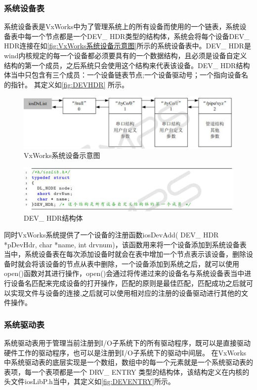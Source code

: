 	
\subsubsection{系统设备表}
	系统设备表是VxWorks中为了管理系统上的所有设备而使用的一个链表，系统设备表中每一个节点都是一个DEV\_ HDR类型的结构体，系统会将每个设备DEV\_ HDR连接在如\autoref{fig:VxWorks系统设备示意图}所示的系统设备表中。DEV\_ HDR是wind内核规定的每一个设备都必须要具有的一个数据结构，且必须是设备自定义结构的第一个成员，之后系统只会使用这个结构来代表该设备。DEV\_ HDR结构体当中只包含有三个成员：一个设备链表节点;一个设备驱动号；一个指向设备名的指针。
	其定义如\autoref{fig:DEVHDR} 所示。

\begin{figure}[!h]
\centering
\includegraphics[width=1.0\textwidth]{./graphics/vxworks-device-link.pdf}
\caption{VxWorks系统设备示意图}\label{fig:VxWorks系统设备示意图}
\end{figure}
	
\begin{figure}[!h]
\centering
\includegraphics[width=1.0\textwidth]{./graphics/DEVHDR.pdf}
\caption{DEV\_ HDR结构体}\label{fig:DEVHDR}
\end{figure}

同时VxWorks系统提供了一个设备的注册函数iosDevAdd( DEV\_ HDR *pDevHdr, char *name, int drvnum)，该函数用来将一个设备添加到系统设备表当中，系统设备表在每次添加设备时就会在表中增加一个节点表示该设备，删除设备时就会将该设备的节点从表中删除，一个设备添加到系统之后，就可以使用open()函数对其进行操作，open()会通过将传递过来的设备名与系统设备表当中进行设备名匹配来完成设备的打开操作，匹配的原则是最佳匹配，匹配成功之后就可以实现文件与设备的连接\cite{刘小军2008基于},之后就可以使用相对应的注册的设备驱动进行其他的文件操作。

\subsubsection{系统驱动表}	
	系统驱动表用于管理当前注册到I/O子系统下的所有驱动程序，既可以是直接驱动硬件工作的驱动程序，也可以是注册到I/O子系统下的驱动中间层\cite{VxWorks内核解读}。
	在VxWorks中系统驱动表的底层实现是一个数组，数组中的每一个元素就是一个系统驱动表的表项，每一个表项都是一个 DRV\_ ENTRY 类型的结构体，该结构定义在内核的头文件iosLibP.h当中，其定义如\autoref{fig:DEVENTRY}所示。
	

